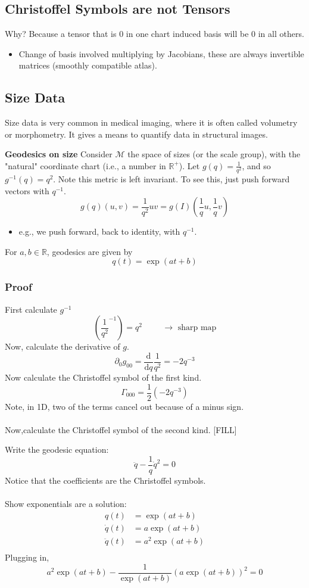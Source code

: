 \documentclass[10pt]{article}
\newcommand{\R}{\mathbb{R}}
\newcommand{\dd}{\text{d}}
\begin{document}
\subsection*{Christoffel Symbols are not Tensors}
Why?  Because a tensor that is 0 in one chart induced basis will be 0 in all others.
\begin{itemize}
	\item Change of basis involved multiplying by Jacobians, these are always invertible matrices (smoothly compatible atlas).
\end{itemize}

\subsection*{Size Data}
Size data is very common in medical imaging, where it is often called volumetry or morphometry.  It gives a means to quantify data in structural images.

\textbf{Geodesics on size}
Consider $\mathcal{M}$ the space of sizes (or the scale group), with the "natural" coordinate chart (i.e., a number in $\R^+$).  Let $g(q) = \frac{1}{q^2}$, and so $g^{-1}(q) = q^2$.  Note this metric is left invariant.  To see this, just push forward vectors with $q^{-1}$.
\[g(q)(u, v) = \frac{1}{q^2}uv = g(I) (\frac{1}{q}u, \frac{1}{q}v)\]
\begin{itemize}
	\item e.g., we push forward, back to identity, with $q^{-1}$.
\end{itemize}
For $a, b \in \R$, geodesics are given by
\[q(t) = \exp(at + b)\]

\subsubsection*{Proof}
First calculate $g^{-1}$
\[\left(\frac{1}{q^2}^{-1}\right) = q^{2} \hspace{1cm} \rightarrow \text{ sharp map}\]
Now, calculate the derivative of $g$.
\[\partial_0 g_{00} = \frac{\dd}{\dd q} \frac{1}{q^2} = -2q^{-3}\]
Now calculate the Christoffel symbol of the first kind.
\[\Gamma_{000} = \frac{1}{2} (-2 q^{-3})\]
Note, in 1D, two of the terms cancel out because of a minus sign.\\\\
Now,calculate the Christoffel symbol of the second kind.
[FILL]

Write the geodesic equation:
\[\ddot{q} - \frac{1}{q} \dot{q}^2 = 0\]
Notice that the coefficients are the Christoffel symbols.\\\\
Show exponentials are a solution:
\begin{align*}
    q(t) &= \exp(at + b)\\
    \dot{q}(t) &= a \exp(at + b)\\
    \ddot{q}(t) &= a^2 \exp(at + b)\\
\end{align*}
Plugging in,
\[a^2 \exp(at + b) - \frac{1}{\exp(at + b)} (a \exp(at + b))^2 = 0\]
\end{document}
